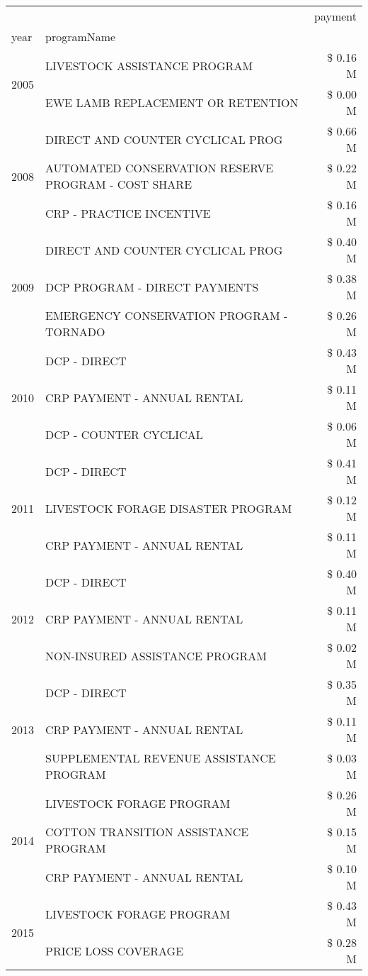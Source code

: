 \begin{tabular}{llr}
\toprule
 &  & payment \\
year & programName &  \\
\midrule
\multirow[t]{2}{*}{2005} & LIVESTOCK ASSISTANCE PROGRAM & \$ 0.16 M \\
 & EWE LAMB REPLACEMENT OR RETENTION & \$ 0.00 M \\
\cline{1-3}
\multirow[t]{3}{*}{2008} & DIRECT AND COUNTER CYCLICAL PROG & \$ 0.66 M \\
 & AUTOMATED CONSERVATION RESERVE PROGRAM - COST SHARE & \$ 0.22 M \\
 & CRP - PRACTICE INCENTIVE & \$ 0.16 M \\
\cline{1-3}
\multirow[t]{3}{*}{2009} & DIRECT AND COUNTER CYCLICAL PROG & \$ 0.40 M \\
 & DCP PROGRAM - DIRECT PAYMENTS & \$ 0.38 M \\
 & EMERGENCY CONSERVATION PROGRAM - TORNADO & \$ 0.26 M \\
\cline{1-3}
\multirow[t]{3}{*}{2010} & DCP - DIRECT & \$ 0.43 M \\
 & CRP PAYMENT - ANNUAL RENTAL & \$ 0.11 M \\
 & DCP - COUNTER CYCLICAL & \$ 0.06 M \\
\cline{1-3}
\multirow[t]{3}{*}{2011} & DCP - DIRECT & \$ 0.41 M \\
 & LIVESTOCK FORAGE DISASTER PROGRAM & \$ 0.12 M \\
 & CRP PAYMENT - ANNUAL RENTAL & \$ 0.11 M \\
\cline{1-3}
\multirow[t]{3}{*}{2012} & DCP - DIRECT & \$ 0.40 M \\
 & CRP PAYMENT - ANNUAL RENTAL & \$ 0.11 M \\
 & NON-INSURED ASSISTANCE PROGRAM & \$ 0.02 M \\
\cline{1-3}
\multirow[t]{3}{*}{2013} & DCP - DIRECT & \$ 0.35 M \\
 & CRP PAYMENT - ANNUAL RENTAL & \$ 0.11 M \\
 & SUPPLEMENTAL REVENUE ASSISTANCE PROGRAM & \$ 0.03 M \\
\cline{1-3}
\multirow[t]{3}{*}{2014} & LIVESTOCK FORAGE PROGRAM & \$ 0.26 M \\
 & COTTON TRANSITION ASSISTANCE PROGRAM & \$ 0.15 M \\
 & CRP PAYMENT - ANNUAL RENTAL & \$ 0.10 M \\
\cline{1-3}
\multirow[t]{3}{*}{2015} & LIVESTOCK FORAGE PROGRAM & \$ 0.43 M \\
 & PRICE LOSS COVERAGE & \$ 0.28 M \\

\end{tabular}
